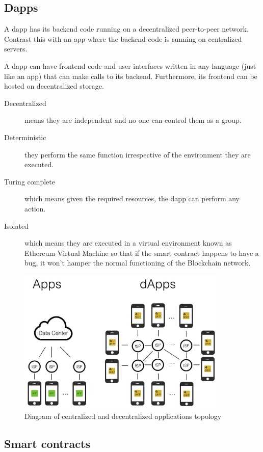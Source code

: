 \subsection{Dapps}

A dapp has its backend code running on a decentralized peer-to-peer network. Contrast this with an app where the backend code is running on centralized servers.

A dapp can have frontend code and user interfaces written in any language (just like an app) that can make calls to its backend. Furthermore, its frontend can be hosted on decentralized storage.\cite{ethereumcommunityEthereumDevelopmentDocumentation}

\begin{description}
\item[Decentralized] means they are independent and no one can control them as a group.
\item[Deterministic] they perform the same function irrespective of the environment they are executed.
\item[Turing complete] which means given the required resources, the dapp can perform any action.
\item[Isolated] which means they are executed in a virtual environment known as Ethereum Virtual Machine so that if the smart contract happens to have a bug, it won’t hamper the normal functioning of the Blockchain network.
\end{description}

\begin{figure}[H]
	\centering
		\includegraphics[width=10cm]{images/chapter2/dapps.png}
		\caption{{\footnotesize Diagram of centralized and decentralized applications topology}}
\end{figure}

\subsection{Smart contracts}

